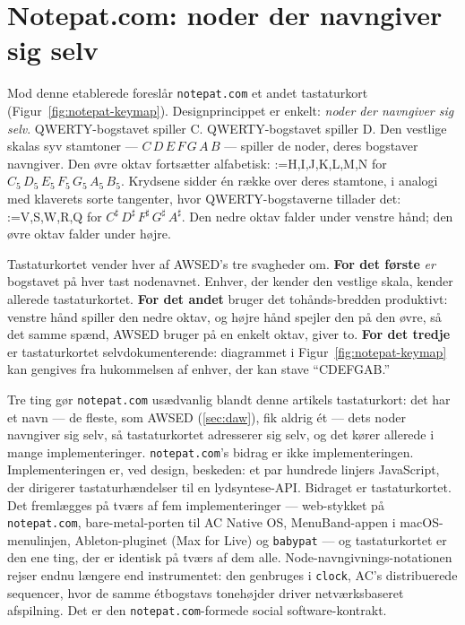 \documentclass[10pt,letterpaper,twocolumn]{article}
\makeatletter
\DeclareRobustCommand{\key}[1]{\tikz[baseline=(k.base)]{%
 \node[fill=keystroke, rounded corners=1.3pt, inner xsep=2.4pt,
    inner ysep=1.9pt, anchor=base, yshift=-1.2pt] at (0,0)
  {\footnotesize\ttfamily\bfseries\vphantom{A}\phantom{#1}};
 \node[draw=keystroke, line width=0.4pt, fill=keyfill,
    rounded corners=1.3pt, inner xsep=2.4pt, inner ysep=1.9pt,
    anchor=base] (k) at (0,0)
  {\footnotesize\ttfamily\bfseries\vphantom{A}#1};}}
\DeclareRobustCommand{\keys}[1]{{\def\sep{}\@for\kk:=#1\do{\sep\key{\kk}\def\sep{\,}}}}
\makeatother
\begin{document}
\section{Notepat.com: noder der navngiver sig selv}
\label{sec:notepat}

Mod denne etablerede foreslår \texttt{notepat.com} et andet tastaturkort (Figur~\ref{fig:notepat-keymap}). Designprincippet er enkelt: \emph{noder der navngiver sig selv}. QWERTY-bogstavet \key{C} spiller C. QWERTY-bogstavet \key{D} spiller D. Den vestlige skalas syv stamtoner --- $C\,D\,E\,F\,G\,A\,B$ --- spiller de noder, deres bogstaver navngiver. Den øvre oktav fortsætter alfabetisk: \keys{H,I,J,K,L,M,N} for $C_5\,D_5\,E_5\,F_5\,G_5\,A_5\,B_5$. Krydsene sidder én række over deres stamtone, i analogi med klaverets sorte tangenter, hvor QWERTY-bogstaverne tillader det: \keys{V,S,W,R,Q} for $C^\sharp\,D^\sharp\,F^\sharp\,G^\sharp\,A^\sharp$. Den nedre oktav falder under venstre hånd; den øvre oktav falder under højre.

Tastaturkortet vender hver af AWSED's tre svagheder om. \textbf{For det første} \emph{er} bogstavet på hver tast nodenavnet. Enhver, der kender den vestlige skala, kender allerede tastaturkortet. \textbf{For det andet} bruger det tohånds-bredden produktivt: venstre hånd spiller den nedre oktav, og højre hånd spejler den på den øvre, så det samme spænd, AWSED bruger på en enkelt oktav, giver to. \textbf{For det tredje} er tastaturkortet selvdokumenterende: diagrammet i Figur~\ref{fig:notepat-keymap} kan gengives fra hukommelsen af enhver, der kan stave ``CDEFGAB.''

Tre ting gør \texttt{notepat.com} usædvanlig blandt denne artikels tastaturkort: det har et navn --- de fleste, som AWSED (\textsection\ref{sec:daw}), fik aldrig ét --- dets noder navngiver sig selv, så tastaturkortet adresserer sig selv, og det kører allerede i mange implementeringer. \texttt{notepat.com}'s bidrag er ikke implementeringen. Implementeringen er, ved design, beskeden: et par hundrede linjers JavaScript, der dirigerer tastaturhændelser til en lydsyntese-API. Bidraget er tastaturkortet. Det fremlægges på tværs af fem implementeringer --- web-stykket på \texttt{notepat.com}, bare-metal-porten til AC Native OS, MenuBand-appen i macOS-menulinjen, Ableton-pluginet (Max for Live) og \texttt{babypat} --- og tastaturkortet er den ene ting, der er identisk på tværs af dem alle. Node-navngivnings-notationen rejser endnu længere end instrumentet: den genbruges i \texttt{clock}, AC's distribuerede sequencer, hvor de samme étbogstavs tonehøjder driver netværksbaseret afspilning. Det er den \texttt{notepat.com}-formede social software-kontrakt.
\end{document}
